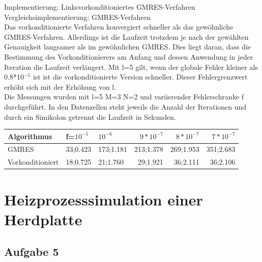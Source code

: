 \documentclass{report}
\begin{document}
Implementierung: Linksvorkonditioniertes GMRES-Verfahren\\
Vergleichsimplementierung: GMRES-Verfahren\\
Das vorkonditionierte Verfahren konvergiert schneller als das gewöhnliche GMRES-Verfahren. Allerdings ist die Laufzeit trotzdem je nach der gewählten Genauigkeit langsamer als im gewöhnlichen GMRES. Dies liegt daran, dass die Bestimmung des Vorkonditionierers am Anfang und dessen Anwendung in jeder Iteration die Laufzeit verlängert. Mit l=5 gilt, wenn der globale Fehler kleiner als 0.8*10$^{-5}$ ist ist die vorkonditionierte Version schneller. Dieser Fehlergrenzwert erhöht sich mit der Erhöhung von l.\\
Die Messungen wurden mit l=5 M=3 N=2 und variierender Fehlerschranke f durchgeführt. In den Datenzellen steht jeweils die Anzahl der Iterationen und durch ein Simikolon getrennt die Laufzeit in Sekunden.\\

\begin{tabular}{|l|l|l|r|r|r|}
	\hline
	Algorithmus&f=$10^{-5}$ &$10^{-6}$&$9*10^{-7}$& $8*10^{-7}$& $7*10^{-7}$\\
	\hline
	GMRES & 33;0.423 & 173;1.181 & 213;1.378 & 269;1.953 & 351;2.683 \\
	Vorkonditioniert & 18;0.725 & 21;1.760 & 29;1.921 & 36;2.111 & 36;2.106 \\
	\hline
	
\end{tabular}
\section{Heizprozesssimulation einer Herdplatte}
\subsection{Aufgabe 5}
\end{document}
